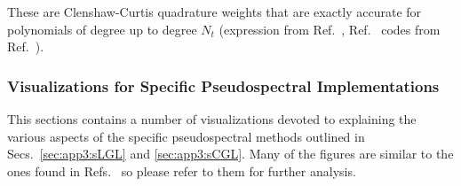 \noindent These are Clenshaw-Curtis quadrature weights that are exactly accurate for polynomials of degree up to degree $N_t$ (expression from Ref.~\cite{Waldvogel2006a}, Ref.~\cite{github-basic-multiple-interval-pseudospectral} codes from Ref.~\cite[p.~128]{Trefethen2000a}).


\subsubsection{Visualizations for Specific Pseudospectral Implementations}

This sections contains a number of visualizations devoted to explaining the various aspects of the specific pseudospectral methods outlined in Secs.~\ref{sec:app3:sLGL} and \ref{sec:app3:sCGL}. Many of the figures are similar to the ones found in Refs.~\cite{Becerra2010b, Becerra2015a} so please refer to them for further analysis.

